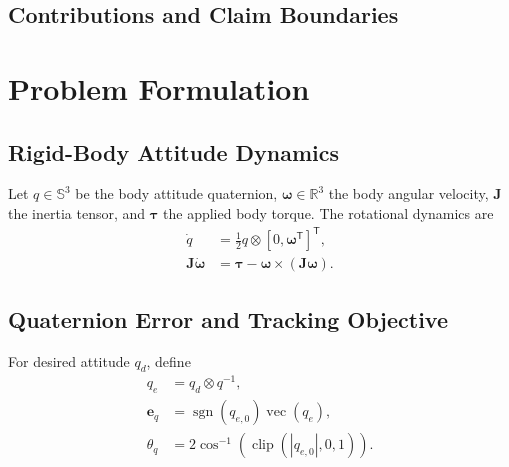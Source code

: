 \documentclass[letterpaper,10pt,conference]{ieeeconf}
\newcommand{\R}{\mathbb{R}}
\newcommand{\T}{^{\mathsf T}}
\newcommand{\clip}{\operatorname{clip}}
\newcommand{\sgn}{\operatorname{sgn}}
\begin{document}
\subsection{Contributions and Claim Boundaries}


\section{Problem Formulation}
\label{sec:problem}

\subsection{Rigid-Body Attitude Dynamics}

Let $q\in\mathbb{S}^{3}$ be the body attitude quaternion,
$\bm\omega\in\R^3$ the body angular velocity, $\bm J$ the inertia tensor,
and $\bm\tau$ the applied body torque. The rotational dynamics are
\begin{align}
    \dot q &= \frac{1}{2}q\otimes[0,\bm\omega\T]\T, \\
    \bm J\dot{\bm\omega}
    &= \bm\tau-\bm\omega\times(\bm J\bm\omega).
\end{align}

\subsection{Quaternion Error and Tracking Objective}

For desired attitude $q_d$, define
\begin{align}
    q_e &= q_d\otimes q^{-1}, \\
    \bm e_q &= \sgn(q_{e,0})\operatorname{vec}(q_e), \\
    \theta_q &= 2\cos^{-1}\!\left(\clip(|q_{e,0}|,0,1)\right).
\end{align}

\end{document}
